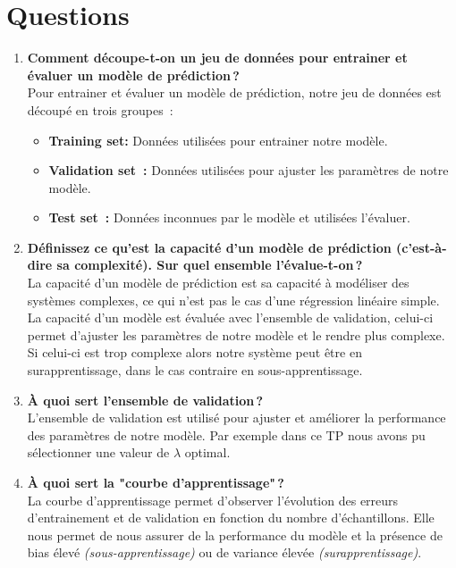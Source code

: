\section{Questions}


\begin{enumerate}
    \item \textbf{Comment découpe-t-on un jeu de données pour entrainer et évaluer un modèle de prédiction\,?}\\
    Pour entrainer et évaluer un modèle de prédiction, notre jeu de données est découpé en trois groupes~:
    \begin{itemize}
        \item \textbf{Training set:} Données utilisées pour entrainer notre modèle.
        \item \textbf{Validation set~:} Données utilisées pour ajuster les paramètres de notre modèle.
        \item \textbf{Test set~:} Données inconnues par le modèle et utilisées l'évaluer.
    \end{itemize}

    \clearpage
    
    \item \textbf{Définissez ce qu'est la capacité d'un modèle de prédiction (c'est-à-dire sa complexité). Sur quel ensemble l'évalue-t-on\,?} \\
    La capacité d'un modèle de prédiction est sa capacité à modéliser des systèmes complexes, ce qui n'est pas le cas d'une régression linéaire simple. La capacité d'un modèle est évaluée avec l'ensemble de 
    validation, celui-ci permet d'ajuster les paramètres de notre modèle et le rendre plus complexe. Si celui-ci est trop complexe alors notre système peut être en surapprentissage, dans le cas contraire en sous-apprentissage.
    \vspace{0.5cm}

    \item \textbf{À quoi sert l'ensemble de validation\,?} \\
    L'ensemble de validation est utilisé pour ajuster et améliorer la performance des paramètres de notre modèle. Par exemple dans ce TP nous avons pu sélectionner une valeur de $\lambda$ optimal.
    \vspace{0.5cm}

    \item \textbf{À quoi sert la "courbe d'apprentissage"\,?} \\
    La courbe d'apprentissage permet d'observer l'évolution des erreurs d'entrainement et de validation en fonction du nombre d'échantillons. Elle nous permet de nous assurer de la performance du modèle et la présence de bias élevé 
    \textit{(sous-apprentissage)} ou de variance élevée \textit{(surapprentissage)}.


\end{enumerate}
